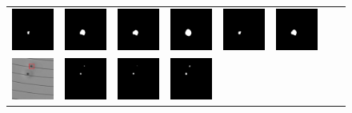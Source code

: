 \documentclass[sn-mathphys]{sn-jnl}%
\theoremstyle{thmstyleone}%
\theoremstyle{thmstyletwo}%
\theoremstyle{thmstylethree}%
\begin{document}
\begin{figure}
{\begin{tabular}{p{1.3cm}p{1.3cm}p{1.3cm}p{1.3cm}p{1.3cm}p{1.3cm}p{1.3cm}p{1.3cm}}
    \includegraphics[width=0.65in]{fig13-qipao44baseline.png}&
    \includegraphics[width=0.65in]{fig13-qipao44cutout.png}&
    \includegraphics[width=0.65in]{fig13-qipao44has.png}&
    \includegraphics[width=0.65in]{fig13-qipao44gridmask.png}&
    \includegraphics[width=0.65in]{fig13-qipao44cutmix.png}&
    \includegraphics[width=0.65in]{fig13-qipao44ours.png}\\
    \includegraphics[width=0.65in]{fig13-qipao28inputs.png}&
    \includegraphics[width=0.65in]{fig13-qipao28y.png}&
    \includegraphics[width=0.65in]{fig13-qipao28baseline.png}&
    \includegraphics[width=0.65in]{fig13-qipao28cutout.png}&

\end{tabular}}
\end{figure}
\end{document}
